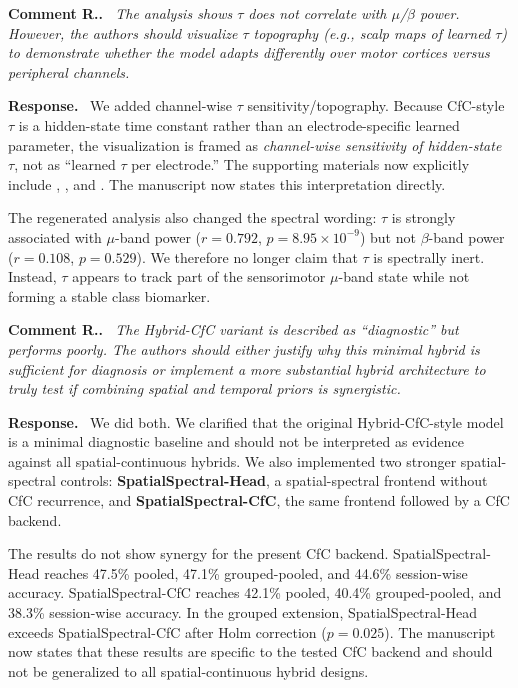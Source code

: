 \documentclass[11pt]{article}
\newcounter{reviewer}
\newcounter{point}[reviewer]
\renewcommand{\thepoint}{\thereviewer.\arabic{point}}
\newenvironment{reviewercomment}
  {\refstepcounter{point}\medskip\noindent\textbf{Comment R\thepoint.}\itshape\ }
  {\par}
\newenvironment{response}
  {\medskip\noindent\textbf{Response.}\ }
  {\par\medskip}
\begin{document}
\begin{reviewercomment}
The analysis shows $\tau$ does not correlate with $\mu$/$\beta$ power. However, the authors should visualize $\tau$ topography (e.g., scalp maps of learned $\tau$) to demonstrate whether the model adapts differently over motor cortices versus peripheral channels.
\end{reviewercomment}

\begin{response}
We added channel-wise $\tau$ sensitivity/topography. Because CfC-style $\tau$ is a hidden-state time constant rather than an electrode-specific learned parameter, the visualization is framed as \emph{channel-wise sensitivity of hidden-state $\tau$}, not as ``learned $\tau$ per electrode.'' The supporting materials now explicitly include , , and . The manuscript now states this interpretation directly.

The regenerated analysis also changed the spectral wording: $\tau$ is strongly associated with $\mu$-band power ($r=0.792$, $p=8.95\times10^{-9}$) but not $\beta$-band power ($r=0.108$, $p=0.529$). We therefore no longer claim that $\tau$ is spectrally inert. Instead, $\tau$ appears to track part of the sensorimotor $\mu$-band state while not forming a stable class biomarker.
\end{response}

\begin{reviewercomment}
The Hybrid-CfC variant is described as ``diagnostic'' but performs poorly. The authors should either justify why this minimal hybrid is sufficient for diagnosis or implement a more substantial hybrid architecture to truly test if combining spatial and temporal priors is synergistic.
\end{reviewercomment}

\begin{response}
We did both. We clarified that the original Hybrid-CfC-style model is a minimal diagnostic baseline and should not be interpreted as evidence against all spatial-continuous hybrids. We also implemented two stronger spatial-spectral controls: \textbf{SpatialSpectral-Head}, a spatial-spectral frontend without CfC recurrence, and \textbf{SpatialSpectral-CfC}, the same frontend followed by a CfC backend.

The results do not show synergy for the present CfC backend. SpatialSpectral-Head reaches 47.5\% pooled, 47.1\% grouped-pooled, and 44.6\% session-wise accuracy. SpatialSpectral-CfC reaches 42.1\% pooled, 40.4\% grouped-pooled, and 38.3\% session-wise accuracy. In the grouped extension, SpatialSpectral-Head exceeds SpatialSpectral-CfC after Holm correction ($p=0.025$). The manuscript now states that these results are specific to the tested CfC backend and should not be generalized to all spatial-continuous hybrid designs.
\end{response}
\end{document}
